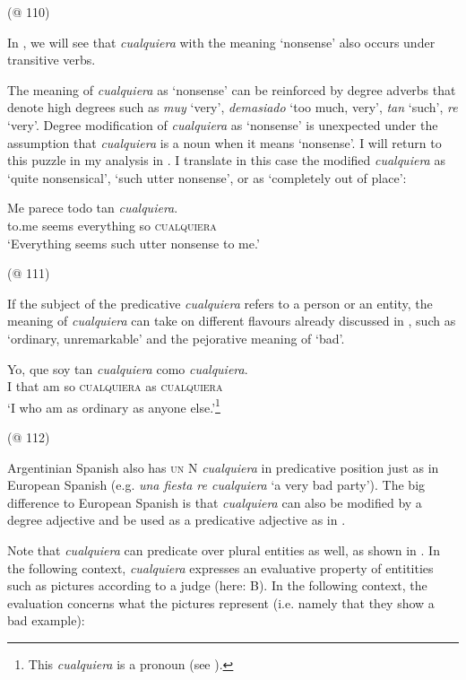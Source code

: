     (@ 110)
\z

In , we will see that \textit{cualquiera} with the meaning ‘nonsense’ also occurs under transitive verbs.

The meaning of \textit{cualquiera} as ‘nonsense’ can be reinforced by degree adverbs that denote high degrees such as \textit{muy} ‘very’, \textit{demasiado} ‘too much, very’, \textit{tan} ‘such’, \textit{re} ‘very’. Degree modification of \textit{cualquiera} as ‘nonsense’ is unexpected under the assumption that \textit{cualquiera} is a noun when it means ‘nonsense’. I will return to this puzzle in my analysis in . I translate in this case the modified \textit{cualquiera} as ‘quite nonsensical’, ‘such utter nonsense’, or as ‘completely out of place’:

\ea \label{ex:key:198} %
 \gll Me parece todo tan \textit{cualquiera}.\\
to.me seems everything so \textsc{cualquiera}\\
\glt ‘Everything seems such utter nonsense to me.’

(@ 111)
\z

If the subject of the predicative \textit{cualquiera} refers to a person or an entity, the meaning of \textit{cualquiera} can take on different flavours already discussed in , such as ‘ordinary, unremarkable’ and the pejorative meaning of ‘bad’.

\ea \label{ex:key:199} %
  \gll Yo, que soy tan \textit{cualquiera} como \textit{cualquiera}.\\
I that am so \textsc{cualquiera} as \textsc{cualquiera}\\
\glt ‘I who am as ordinary as anyone else.’\footnote{This \textit{cualquiera} is a pronoun (see ).}

    (@ 112)
\z

Argentinian Spanish also has \textsc{un} N \textit{cualquiera} in predicative position just as in European Spanish (e.g. \textit{una fiesta re cualquiera} ‘a very bad party’). The big difference to European Spanish is that \textit{cualquiera} can also be modified by a degree adjective and be used as a predicative adjective as in .

Note that \textit{cualquiera} can predicate over plural entities as well, as shown in . In the following context, \textit{cualquiera} expresses an evaluative property of entitities such as pictures according to a judge (here: B). In the following context, the evaluation concerns what the pictures represent (i.e. namely that they show a bad example):

